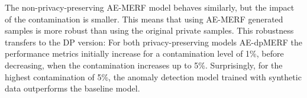 The non-privacy-preserving AE-MERF model behaves similarly, but the impact of the contamination is smaller. This means that using AE-MERF generated samples is more robust than using the original private samples. This robustness transfers to the DP version: For both privacy-preserving models AE-dpMERF the performance metrics initially increase for a contamination level of 1\%, before decreasing, when the contamination increases up to 5\%. Surprisingly, for the highest contamination of 5\%, the anomaly detection model trained with synthetic data outperforms the baseline model. 

